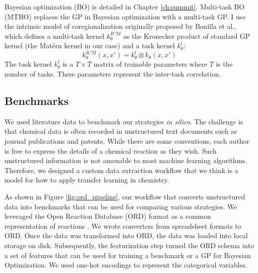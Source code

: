 Bayesian optimization (BO) is detailed in Chapter \ref{ch:summit}. Multi-task BO (MTBO) replaces the GP in Bayesian optimization with a multi-task GP. I use the intrinsic model of coregionalization originally proposed by Bonilla et al.,\cite{Bonilla2007} which defines a multi-task kernel $k^{ICM}_{\theta}$ as the Kronecker product of standard GP kernel (the Matérn kernel in our case) and a task kernel $k^t_{\theta}$:
\begin{equation}
    k^{ICM}_{\theta}(x,x') = k^t_{\theta} \otimes  k_{\theta}(x,x')
\end{equation}
The task kernel $k^t_{\theta}$ is a $T \times T$ matrix of trainable parameters where $T$ is the number of tasks. These parameters represent the inter-task correlation.

\subsection{Benchmarks}

We used literature data to benchmark our strategies \textit{in silico}. The challenge is that chemical data is often recorded in unstructured text documents such as journal publications and patents. While there are some conventions, each author is free to express the details of a chemical reaction as they wish. Such unstructured information is not amenable to most machine learning algorithms. Therefore, we designed a custom data extraction workflow that we think is a model for how to apply transfer learning in chemistry.

As shown in Figure \ref{fig:ord_pipeline}, our workflow that converts unstructured data into benchmarks that can be used for comparing various strategies.  We leveraged the Open Reaction Database (ORD) format as a common representation of reactions \cite{Kearnes2021}. We wrote converters from spreadsheet formats to ORD. Once the data was transformed into ORD, the data was loaded into local storage on disk. Subsequently, the featurization step turned the ORD schema into a set of features that can be used for training a benchmark or a GP for Bayesian Optimization.  We used one-hot encodings to represent the categorical variables. 

